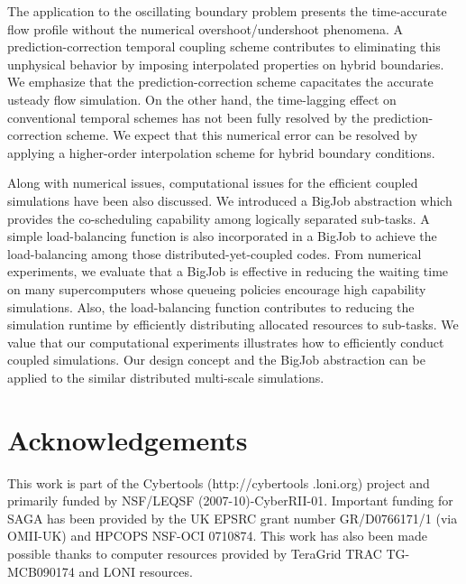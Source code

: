\documentclass[preprint,12pt]{elsarticle}
\begin{document}
The application to the oscillating boundary problem presents
the time-accurate flow profile without the numerical overshoot/undershoot
phenomena. A prediction-correction temporal coupling scheme
contributes to eliminating this unphysical behavior by imposing
interpolated properties on hybrid boundaries. We emphasize that
the prediction-correction scheme capacitates the accurate
usteady flow simulation.
On the other hand, the time-lagging effect on conventional temporal
schemes has not been fully resolved by the prediction-correction scheme.
We expect that this numerical error can be resolved by applying
a higher-order interpolation scheme for hybrid boundary conditions.

Along with numerical issues, computational issues for the efficient
coupled simulations have been also discussed. We introduced a BigJob
abstraction which provides the co-scheduling capability among
logically separated sub-tasks. A simple load-balancing function
is also incorporated in a BigJob to achieve the load-balancing among
those distributed-yet-coupled codes. From numerical experiments,
we evaluate that a BigJob is effective in reducing the waiting time
on many supercomputers whose queueing policies encourage high capability
simulations. Also, the load-balancing function contributes to reducing
the simulation runtime by efficiently distributing allocated resources
to sub-tasks. We value that our computational experiments illustrates
how to efficiently conduct coupled simulations. Our design concept and
the BigJob abstraction can be applied to the similar distributed
multi-scale simulations.

\section*{Acknowledgements}
This work is part of the Cybertools (http://cybertools .loni.org)
project and primarily funded by NSF/LEQSF (2007-10)-CyberRII-01.
Important funding for SAGA has been provided by the UK EPSRC grant
number GR/D0766171/1 (via OMII-UK) and HPCOPS NSF-OCI 0710874. This
work has also been made possible thanks to computer resources provided
by TeraGrid TRAC TG-MCB090174 and LONI resources.


\end{document}
